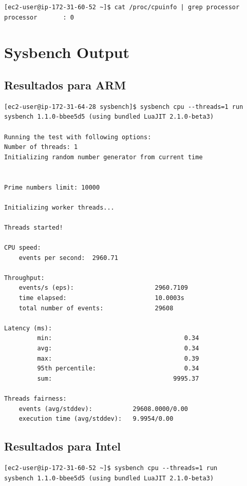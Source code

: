 \documentclass[a4paper,openright,12pt]{article}
\begin{document}
\begin{appendices}
\begin{verbatim}
[ec2-user@ip-172-31-60-52 ~]$ cat /proc/cpuinfo | grep processor
processor       : 0
\end{verbatim}

\section{Sysbench Output}\label{anexo:sysbench_output}
\subsection{Resultados para ARM}
\begin{verbatim}
[ec2-user@ip-172-31-64-28 sysbench]$ sysbench cpu --threads=1 run
sysbench 1.1.0-bbee5d5 (using bundled LuaJIT 2.1.0-beta3)

Running the test with following options:
Number of threads: 1
Initializing random number generator from current time


Prime numbers limit: 10000

Initializing worker threads...

Threads started!

CPU speed:
    events per second:  2960.71

Throughput:
    events/s (eps):                      2960.7109
    time elapsed:                        10.0003s
    total number of events:              29608

Latency (ms):
         min:                                    0.34
         avg:                                    0.34
         max:                                    0.39
         95th percentile:                        0.34
         sum:                                 9995.37

Threads fairness:
    events (avg/stddev):           29608.0000/0.00
    execution time (avg/stddev):   9.9954/0.00
\end{verbatim}
\newpage
\subsection{Resultados para Intel}
\begin{verbatim}
[ec2-user@ip-172-31-60-52 ~]$ sysbench cpu --threads=1 run
sysbench 1.1.0-bbee5d5 (using bundled LuaJIT 2.1.0-beta3)


\end{verbatim}
\end{appendices}
\end{document}
